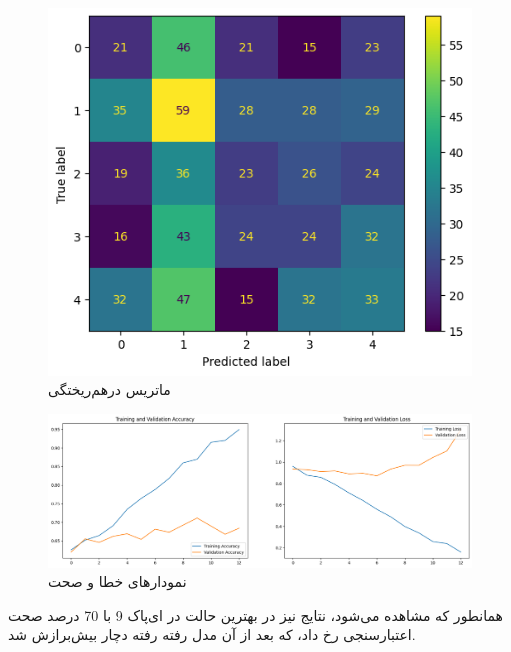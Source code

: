 \documentclass{article}
\begin{document}
\begin{figure}[!h]
    \centering\includegraphics[scale=.70]{./p6-2}
    \caption{ماتریس درهم‌ریختگی}\label{fig.62}
\end{figure}

\begin{figure}[!h]
    \centering\includegraphics[scale=.45]{./p6-3}
    \caption{نمودارهای خطا و صحت}\label{fig.63}
\end{figure}

\cleardoublepage

همانطور که مشاهده می‌شود، نتایج نیز در بهترین حالت در ای‌پاک 9 با 70 درصد صحت اعتبارسنجی رخ داد، که بعد از آن مدل رفته رفته دچار بیش‌برازش شد.



\end{document}

